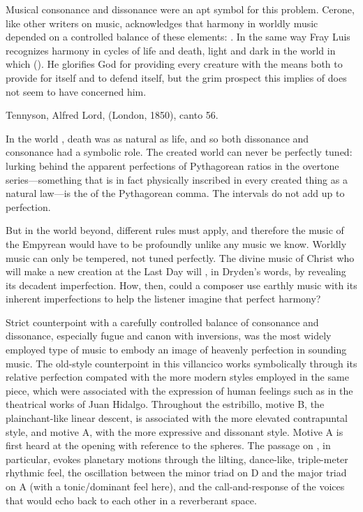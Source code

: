 Musical consonance and dissonance were an apt symbol for this problem.
Cerone, like other writers on music, acknowledges that harmony in worldly music
depended on a controlled balance of these elements: .%
    \Autocite[616]{Cerone:Melopeo}
In the same way Fray Luis recognizes harmony in cycles of life and death, light
and dark in the world in which  ().%
    \Autocite[191]{LuisdeGranada:Simbolo}
He glorifies God for providing every creature with the means both to provide
for itself and to defend itself, but the grim prospect this implies of
 does not seem to have concerned him.%
\begin{Footnote}
    Tennyson, Alfred Lord,  (London, 1850), canto
    56.
\end{Footnote}
In the world , death was as natural as life, and so both
dissonance and consonance had a symbolic role.
The created world can never be perfectly tuned: lurking behind the apparent
perfections of Pythagorean ratios in the overtone series---something that is in
fact physically inscribed in every created thing as a natural law---is the
 of the Pythagorean comma.
The intervals do not add up to perfection.

But in the world beyond, different rules must apply, and therefore the
music of the Empyrean would have to be profoundly unlike any music we know.
Worldly music can only be tempered, not tuned perfectly.
The divine music of Christ who will make a new creation at the Last Day will
, in Dryden's words, by revealing its decadent
imperfection.
How, then, could a composer use earthly music with its inherent imperfections
to help the listener imagine that perfect harmony?

Strict counterpoint with a carefully controlled balance of consonance and
dissonance, especially fugue and canon with inversions, was the most widely
employed type of music to embody an image of heavenly perfection in sounding
music.
The old-style counterpoint in this villancico works symbolically through its
relative perfection compated with the more modern styles employed in the same
piece, which were associated with the expression of human feelings such as in
the theatrical works of Juan Hidalgo.
Throughout the estribillo, motive B, the plainchant-like linear descent, is
associated with the more elevated contrapuntal style, and motive A, with the
more expressive and dissonant style.
Motive A is first heard at the opening with reference to the spheres.
The passage on , in particular, evokes
planetary motions through the lilting, dance-like, triple-meter rhythmic feel,
the oscillation between the minor triad on D and the major triad on A (with a
tonic/dominant feel here), and the call-and-response of the voices that would
echo back to each other in a reverberant space.

